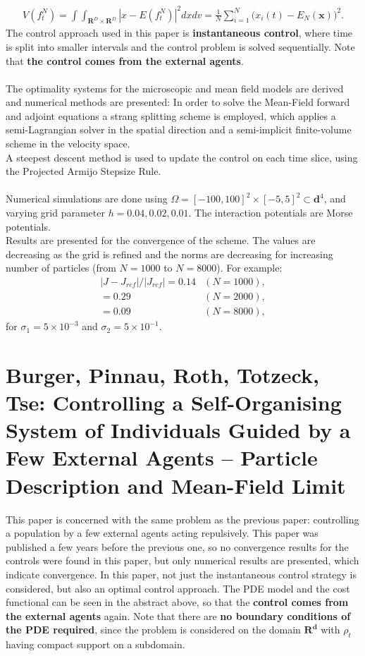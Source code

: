 \documentclass[11pt, a4paper]{article}
\theoremstyle{definition}
\begin{document}
\begin{align*}
V(f_t^N) = \int \int_{\mathbf{R}^D \times \mathbf{R}^D} |x - E(f_t^N)|^2 dx dv = \frac{1}{N}\sum_{i=1}^N \bigg(x_i(t)-E_N(\mathbf{x})\bigg)^2.
\end{align*}
The control approach used in this paper is \textbf{instantaneous control}, where time is split into smaller intervals and the control problem is solved sequentially. Note that \textbf{the control comes from the external agents}.
\\
\\
The optimality systems for the microscopic and mean field models are derived and numerical methods are presented: In order to solve the Mean-Field forward and adjoint equations a strang splitting scheme is employed, which applies a semi-Lagrangian solver in the spatial direction and a semi-implicit finite-volume scheme in the velocity space.\\
A steepest descent method is used to update the control on each time slice, using the Projected Armijo Stepsize Rule.\\
\\
Numerical simulations are done using $\Omega = [-100,100]^2 \times [-5,5]^2 \subset \mathbf{d}^4$, and varying grid parameter $h= 0.04,0.02,0.01$. The interaction potentials are Morse potentials.\\
Results are presented for the convergence of the scheme. The values are decreasing as the grid is refined and the norms are decreasing for increasing number of particles (from $N=1000$ to $N=8000$).
For example:
\begin{align*}
|J-J_{ref}|/|J_{ref}| = 0.14 &(N=1000),\\= 0.29 &(N=2000),\\ =0.09 &(N=8000),
\end{align*}
for $\sigma_1 = 5 \times 10^{-3}$ and $\sigma_2=5 \times 10^{-1}$.



\section{Burger, Pinnau, Roth, Totzeck, Tse: Controlling a Self-Organising System of Individuals Guided by a Few External Agents -- Particle Description and Mean-Field Limit \cite{burger2016controlling}}
This paper is concerned with the same problem as the previous paper: controlling a population by a few external agents acting repulsively. This paper was published a few years before the previous one, so no convergence results for the controls were found in this paper, but only numerical results are presented, which indicate convergence.
In this paper, not just the instantaneous control strategy is considered, but also an optimal control approach. The PDE model and the cost functional can be seen in the abstract above, so that the \textbf{control comes from the external agents} again. Note that there are \textbf{no boundary conditions of the PDE required}, since the problem is considered on the domain $\mathbf{R^d}$ with $\rho_t$ having compact support on a subdomain.
\end{document}
